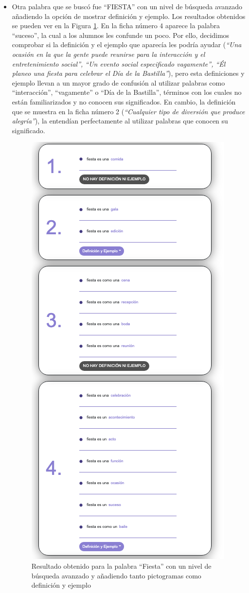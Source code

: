 \begin{itemize}
	\item Otra palabra que se buscó fue ``FIESTA'' con un nivel de búsqueda avanzado añadiendo la opción de mostrar definición y ejemplo. Los resultados obtenidos se pueden ver en la Figura \ref{fig:fiestaAvanzado}. En la ficha número 4 aparece la palabra ``suceso'', la cual a los alumnos les confunde un poco.
	Por ello, decidimos comprobar si la definición y el ejemplo que aparecía les podría ayudar (\textit{``Una ocasión en la que la gente puede reunirse para la interacción y el entretenimiento social'', ``Un evento social especificado vagamente'', ``Él planeo una fiesta para celebrar el Día de la Bastilla''}), pero esta definiciones y ejemplo llevan a un mayor grado de confusión al utilizar palabras como ``interacción'', ``vagamente'' o ``Día de la Bastilla'', términos con los cuales no están familiarizados y no conocen sus significados. En cambio, la definición que se muestra en la ficha número 2 (\textit{``Cualquier tipo de diversión que produce alegría''}), la entendían perfectamente al utilizar palabras que conocen su significado.
	\begin{figure}[!h]
		\includegraphics[width=.7\textwidth]{Imagenes/Bitmap/Capitulo4/EvaluacionFinal/3fiestaavanzadodef.png}
		\centering
		\caption{Resultado obtenido para la palabra ``Fiesta'' con un nivel de búsqueda avanzado y añadiendo tanto pictogramas como definición y ejemplo}
		\label{fig:fiestaAvanzado}
	\end{figure}


\end{itemize}
